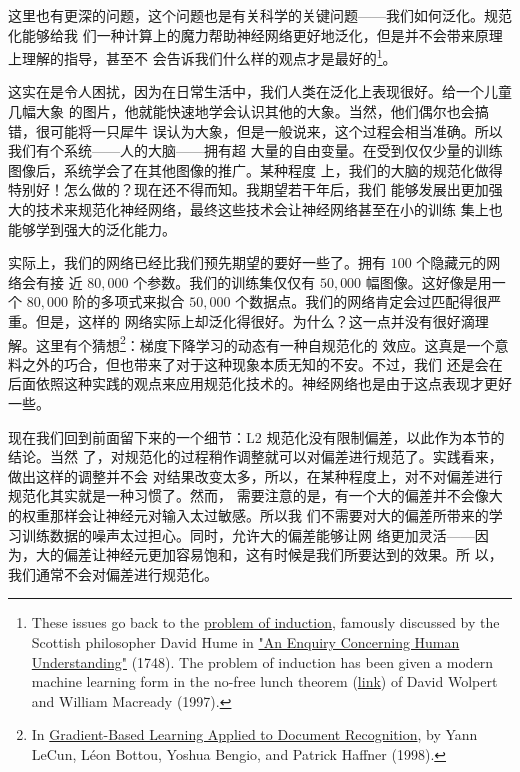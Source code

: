 这里也有更深的问题，这个问题也是有关科学的关键问题——我们如何泛化。规范化能够给我
们一种计算上的魔力帮助神经网络更好地泛化，但是并不会带来原理上理解的指导，甚至不
会告诉我们什么样的观点才是最好的\footnote{These issues go back to the
  \href{http://en.wikipedia.org/wiki/Problem_of_induction}{problem of
    induction}, famously discussed by the Scottish philosopher David Hume in
  \href{http://www.gutenberg.org/ebooks/9662}{"An Enquiry Concerning Human
    Understanding"} (1748). The problem of induction has been given a modern
  machine learning form in the no-free lunch theorem
  (\href{http://ieeexplore.ieee.org/xpl/articleDetails.jsp?tp=&arnumber=585893}{link})
  of David Wolpert and William Macready (1997).}。

这实在是令人困扰，因为在日常生活中，我们人类在泛化上表现很好。给一个儿童几幅大象
的图片，他就能快速地学会认识其他的大象。当然，他们偶尔也会搞错，很可能将一只犀牛
误认为大象，但是一般说来，这个过程会相当准确。所以我们有个系统——人的大脑——拥有超
大量的自由变量。在受到仅仅少量的训练图像后，系统学会了在其他图像的推广。某种程度
上，我们的大脑的规范化做得特别好！怎么做的？现在还不得而知。我期望若干年后，我们
能够发展出更加强大的技术来规范化神经网络，最终这些技术会让神经网络甚至在小的训练
集上也能够学到强大的泛化能力。

实际上，我们的网络已经比我们预先期望的要好一些了。拥有 $100$ 个隐藏元的网络会有接
近 $80,000$ 个参数。我们的训练集仅仅有 $50,000$ 幅图像。这好像是用一个 $80,000$
阶的多项式来拟合 $50,000$ 个数据点。我们的网络肯定会过匹配得很严重。但是，这样的
网络实际上却泛化得很好。为什么？这一点并没有很好滴理解。这里有个猜想\footnote{In
  \href{http://yann.lecun.com/exdb/publis/pdf/lecun-01a.pdf}{Gradient-Based
    Learning Applied to Document Recognition}, by Yann LeCun, Léon Bottou,
  Yoshua Bengio, and Patrick Haffner (1998).}：梯度下降学习的动态有一种自规范化的
效应。这真是一个意料之外的巧合，但也带来了对于这种现象本质无知的不安。不过，我们
还是会在后面依照这种实践的观点来应用规范化技术的。神经网络也是由于这点表现才更好
一些。

现在我们回到前面留下来的一个细节：L2 规范化没有限制偏差，以此作为本节的结论。当然
了，对规范化的过程稍作调整就可以对偏差进行规范了。实践看来，做出这样的调整并不会
对结果改变太多，所以，在某种程度上，对不对偏差进行规范化其实就是一种习惯了。然而，
需要注意的是，有一个大的偏差并不会像大的权重那样会让神经元对输入太过敏感。所以我
们不需要对大的偏差所带来的学习训练数据的噪声太过担心。同时，允许大的偏差能够让网
络更加灵活——因为，大的偏差让神经元更加容易饱和，这有时候是我们所要达到的效果。所
以，我们通常不会对偏差进行规范化。

